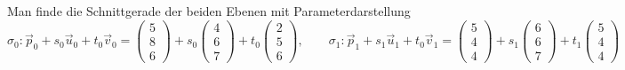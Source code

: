 \begin{beispiel}
Man finde die Schnittgerade der beiden Ebenen mit Parameterdarstellung
\[
\sigma_0:
\vec p_0+s_0\vec u_0+t_0\vec v_0
=\begin{pmatrix}5\\8\\6\end{pmatrix}
+s_0\begin{pmatrix}4\\6\\7\end{pmatrix}
+t_0\begin{pmatrix}2\\5\\6\end{pmatrix}
,
\qquad
\sigma_1:
\vec p_1+s_1\vec u_1+t_0\vec v_1
=\begin{pmatrix}5\\4\\4\end{pmatrix}
+s_1\begin{pmatrix}6\\6\\7\end{pmatrix}
+t_1\begin{pmatrix}5\\4\\4\end{pmatrix}
\]

\smallskip


\end{beispiel}
